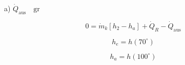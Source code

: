 a) $\dot{Q}_{\text{aus}} \quad \text{gr}$

\[
0 = \dot{m}_k \left[ h_2 - h_a \right] + \dot{Q}_R - \dot{Q}_{\text{aus}}
\]

\[
h_e = h(70^\circ)
\]

\[
h_a = h(100^\circ)
\]
